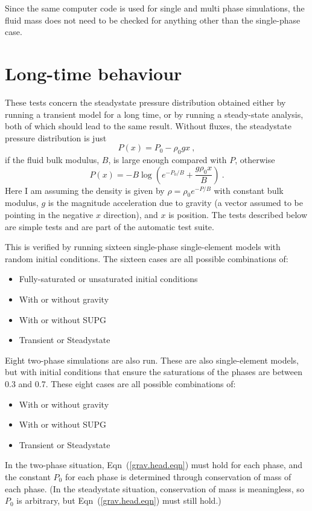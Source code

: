 \documentclass[]{scrreprt}
\begin{document}
Since the same computer code is used for single and multi phase
simulations, the fluid mass does not need to be checked for anything
other than the single-phase case.





\chapter{Long-time behaviour}
\label{gh}

These tests concern the steadystate pressure distribution obtained
either by running a transient model for a long time, or by running a
steady-state analysis, both of which should lead to the same result.
Without fluxes, the steadystate pressure distribution is just
\begin{equation}
P(x) = P_{0} - \rho_{0} g x \ ,
\end{equation}
if the fluid bulk modulus, $B$, is large enough compared with $P$, otherwise
\begin{equation}
P(x) = -B \log\left( e^{-P_{0}/B} + \frac{g\rho_{0}x}{B} \right) \ .
\label{grav.head.eqn}
\end{equation}
Here I am assuming the density is given by $\rho = \rho_{0}e^{-P/B}$
with constant bulk modulus, $g$ is the
magnitude acceleration due to gravity (a vector assumed to be pointing in the
negative $x$ direction), and $x$ is position.  The tests described below
are simple tests and are part of the automatic test suite.

This is verified by running sixteen single-phase single-element models
with random initial conditions.  The sixteen cases are all possible
combinations of:
\begin{itemize}
\item Fully-saturated or unsaturated initial conditions
\item With or without gravity
\item With or without SUPG
\item Transient or Steadystate
\end{itemize}
Eight two-phase simulations are also run.  These are also
single-element models, but with initial conditions that ensure the
saturations of the phases are between 0.3 and 0.7.  These eight cases
are all possible combinations of:
\begin{itemize}
\item With or without gravity
\item With or without SUPG
\item Transient or Steadystate
\end{itemize}
In the two-phase situation, Eqn~(\ref{grav.head.eqn}) must hold for
each phase, and the constant $P_{0}$ for each phase is determined
through conservation of mass of each phase.  (In the steadystate
situation, conservation of mass is meaningless, so $P_{0}$ is
arbitrary, but Eqn~(\ref{grav.head.eqn}) must still hold.)
\end{document}
